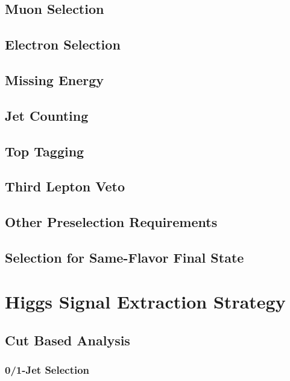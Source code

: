\documentclass{cmspaper}
\begin{document}
   \subsection{Muon Selection} 
     \label{sec:sel_muons}
    
   \subsection{Electron Selection} 
     \label{sec:sel_electrons}
     
   \subsection{Missing Energy} 
     \label{sec:sel_met}
     
   \subsection{Jet Counting} 
     \label{sec:sel_jets}
     
  \subsection{Top Tagging}
     \label{sec:sel_toptag}
     
   \subsection{Third Lepton Veto}
     \label{sec:sel_lepveto}
     
   \subsection{Other Preselection Requirements}
     \label{sec:sel_other}
     
   \subsection{Selection for Same-Flavor Final State}
     \label{sec:sel_sf}
     

\section{Higgs Signal Extraction Strategy}
   
   \label{sec:signal_selection}
   \subsection{Cut Based Analysis}
     \label{sec:anal_cutbased}
    \subsubsection{0/1-Jet Selection}
      \label{sec:sel_zerojet}
      
\end{document}
